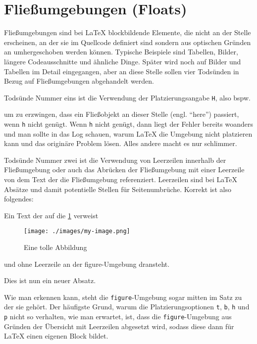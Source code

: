 \section{Fließumgebungen (Floats)}

Fließumgebungen sind bei LaTeX blockbildende Elemente,
die nicht an der Stelle erscheinen, an der sie im Quellcode definiert sind sondern aus optischen
Gründen an umhergeschoben werden können. Typische Beispiele sind Tabellen,
Bilder, längere Codeausschnitte und ähnliche Dinge. Später wird noch auf
Bilder und Tabellen im Detail eingegangen, aber an diese Stelle sollen vier
Todsünden in Bezug auf Fließumgebungen abgehandelt werden.

Todsünde Nummer eins ist die Verwendung der Platzierungsangabe \texttt{H}, also
bspw.
\begin{latex}[caption={Verbot von \texttt{H} als Platzierungsangabe},label={lst:prohibited-h}]
\begin{figure}[H]
\end{figure}
\end{latex}
um zu erzwingen, dass ein Fließobjekt an dieser Stelle (engl. \enquote{here})
passiert, wenn \texttt{h} nicht genügt. Wenn \texttt{h} nicht genügt, dann liegt
der Fehler bereits woanders und man sollte in das Log schauen, warum LaTeX
die Umgebung nicht platzieren kann und das originäre Problem lösen. Alles andere
macht es nur schlimmer.

Todsünde Nummer zwei ist die Verwendung von Leerzeilen innerhalb der
Fließumgebung oder auch das Abrücken der Fließumgebung mit einer Leerzeile von
dem Text der die Fließumgebung referenziert. Leerzeilen sind bei LaTeX Absätze
und damit potentielle Stellen für Seitenumbrüche. Korrekt ist also folgendes:
\begin{latex}[caption={Verbot von Leerzeilen},label={lst:prohibited-blank-lines}]
Ein Text der auf die \cref{fig:my-fig} verweist
\begin{figure}[htbp]
  \centering
  \texttt{[image: ./images/my-image.png]}
  \caption{Eine tolle Abbildung}
  \label{fig:my-fig}
\end{figure}
und ohne Leerzeile an der figure-Umgebung dransteht.

Dies ist nun ein neuer Absatz.
\end{latex}
Wie man erkennen kann, steht die \texttt{figure}-Umgebung sogar mitten im Satz
zu der sie gehört. Der häufigste Grund, warum die Platzierungsoptionen
\texttt{t}, \texttt{b}, \texttt{h} und  \texttt{p} nicht so verhalten, wie
man erwartet, ist, dass die \texttt{figure}-Umgebung aus Gründen der Übersicht
mit Leerzeilen abgesetzt wird, sodass diese dann für LaTeX einen eigenen Block
bildet.

